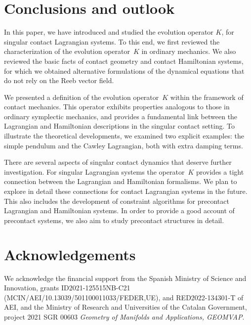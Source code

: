 \documentclass[11pt]{article}
\theoremstyle{plain}
\theoremstyle{definition}
\begin{document}
\section{Conclusions and outlook}
\label{sec:conclusions}


In this paper, we have introduced and studied the evolution operator $K$, for singular contact Lagrangian systems. 
To this end, we first reviewed the characterization of the evolution operator~$K$ in ordinary mechanics. We also reviewed the basic facts of contact geometry and contact Hamiltonian systems, for which we obtained alternative formulations of the dynamical equations that do not rely on the Reeb vector field.

We presented a definition of the evolution operator~$K$ within the framework of contact mechanics. This operator exhibits properties analogous to those in ordinary symplectic mechanics, and provides a fundamental link between the Lagrangian and Hamiltonian descriptions in the singular contact setting. To illustrate the theoretical developments, we examined two explicit examples: the simple pendulum and the Cawley Lagrangian, both with extra damping terms.

There are several aspects of singular contact dynamics that deserve further investigation. 
For singular Lagrangian systems the operator~$K$ provides a tight connection between the Lagrangian and Hamiltonian formalisms. 
We plan to explore in detail these connections for contact Lagrangian systems in the future.
This also includes the development of constraint algorithms for precontact Lagrangian and Hamiltonian systems. In order to provide a good account of precontact systems, we also aim to study precontact structures in detail.


\section*{Acknowledgements}


We acknowledge the financial support from the Spanish Ministry of Science and Innovation, grants  ID2021-125515NB-C21 (MCIN/AEI/10.13039/501100011033/FEDER,UE), and RED2022-134301-T of AEI, 
and the Ministry of Research and Universities of
the Catalan Government, project 2021 SGR 00603 \textsl{Geometry of Manifolds and Applications, GEOMVAP}.
\end{document}

